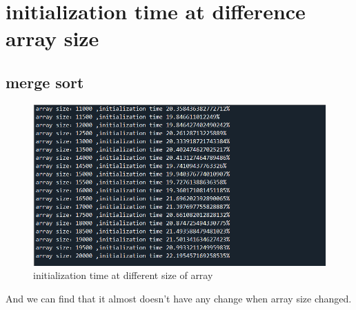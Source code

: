 \documentclass{article}
\begin{document}
\section{initialization time at difference array size}
\subsection{merge sort}
\begin{figure}[H]
    \centering
    \includegraphics[scale=0.5]{mergetime1.png}
    \caption{initialization time at different size of array}
\end{figure}
And we can find that it almost doesn't have any change when array size changed.
\end{document}
